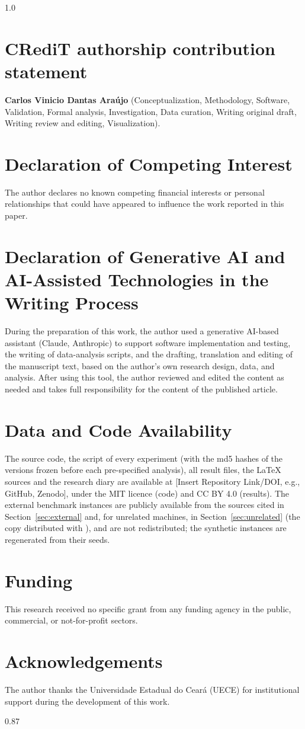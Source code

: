 \documentclass[final,3p,times,11pt,authoryear]{elsarticle}
\begin{document}
\begin{spacing}{1.0}

\section*{CRediT authorship contribution statement}
\textbf{Carlos Vinicio Dantas Ara\'{u}jo} (Conceptualization, Methodology,
Software, Validation, Formal analysis, Investigation, Data curation,
Writing original draft, Writing review and editing, Visualization).

\section*{Declaration of Competing Interest}
The author declares no known competing financial interests or personal
relationships that could have appeared to influence the work reported
in this paper.

\section*{Declaration of Generative AI and AI-Assisted Technologies in the Writing Process}
During the preparation of this work, the author used a generative
AI-based assistant (Claude, Anthropic) to support software implementation
and testing, the writing of data-analysis scripts, and the drafting,
translation and editing of the manuscript text, based on the author's own
research design, data, and analysis. After using this tool, the author reviewed
and edited the content as needed and takes full responsibility for the
content of the published article.

\section*{Data and Code Availability}
The source code, the script of every experiment (with the md5 hashes of the
versions frozen before each pre-specified analysis), all result files, the
LaTeX sources and the research diary are available at [Insert Repository
Link/DOI, e.g., GitHub, Zenodo], under the MIT licence (code) and CC BY 4.0
(results). The external benchmark instances are publicly available from the
sources cited in Section~\ref{sec:external} and, for unrelated machines, in Section~\ref{sec:unrelated} (the copy distributed with \citealp{AbladEtAl2021}), and are not redistributed; the
synthetic instances are regenerated from their seeds.

\section*{Funding}
This research received no specific grant from any funding agency in the
public, commercial, or not-for-profit sectors.

\section*{Acknowledgements}
The author thanks the Universidade Estadual do Cear\'{a} (UECE) for
institutional support during the development of this work.

\end{spacing}
\endgroup

\begingroup
\scriptsize
\setlength{\bibsep}{0pt}
\begin{spacing}{0.87}


\end{spacing}
\endgroup
\end{document}
